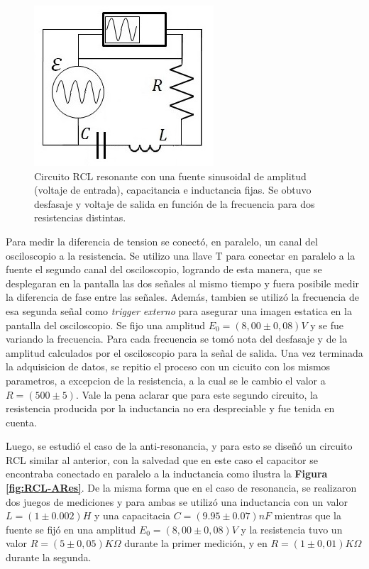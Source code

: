 \documentclass[11pt,a4paper]{article}
\begin{document}
\begin{figure}[h]
\centering
\includegraphics[scale=0.7]{Circuito-RCL-Resonante}
  \caption{Circuito RCL resonante con una fuente sinusoidal de amplitud (voltaje de entrada), capacitancia e inductancia fijas. Se obtuvo desfasaje y voltaje de salida en función de la frecuencia para dos resistencias distintas.}
  \label{fig:RCL-Res}
\end{figure}

Para medir la diferencia de tension se conectó, en paralelo, un canal del osciloscopio a la resistencia. Se utilizo una llave T para conectar en paralelo a la fuente el segundo canal del osciloscopio, logrando de esta manera, que se desplegaran en la pantalla las dos señales al mismo tiempo y fuera posibile medir la diferencia de fase entre las señales. Además, tambien se utilizó la frecuencia de esa segunda señal como \textit{trigger externo} para asegurar una imagen estatica en la pantalla del osciloscopio. Se fijo una amplitud $E_{0} = (8,00 \pm 0,08)V$ y se fue variando la frecuencia. Para cada frecuencia se tomó nota del desfasaje y de la amplitud calculados por el osciloscopio para la señal de salida. Una vez terminada la adquisicion de datos, se repitio el proceso con un cicuito con los mismos parametros, a excepcion de la resistencia, a la cual se le cambio el valor a $R = (500 \pm 5)$. Vale la pena aclarar que para este segundo circuito, la resistencia producida por la inductancia no era despreciable y fue tenida en cuenta.

Luego, se estudió el caso de la anti-resonancia, y para esto se diseñó un circuito RCL similar al anterior, con la salvedad que en este caso el capacitor se encontraba conectado en paralelo a la inductancia como ilustra la \textbf{Figura \ref{fig:RCL-ARes}}. De la misma forma que en el caso de resonancia, se realizaron dos juegos de mediciones y para ambas se utilizó una inductancia con un valor $L = (1 \pm0.002)H$ y una capacitacia $C = (9.95 \pm 0.07)nF$ mientras que la fuente se fijó en una amplitud $E_{0} = (8,00 \pm 0,08)V$ y la resistencia tuvo un valor $R = (5 \pm 0,05)K\Omega$ durante la primer medición, y en $R = (1 \pm 0,01)K\Omega$ durante la segunda.
\end{document}
